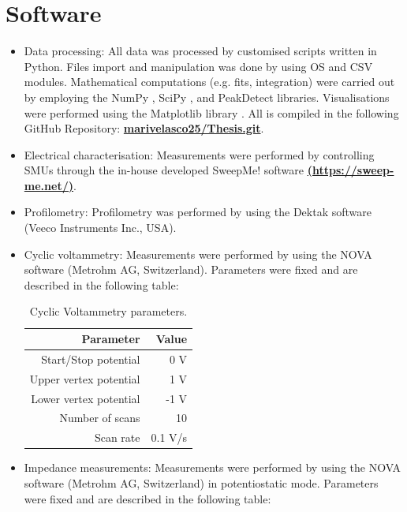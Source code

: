\section{Software} \label{param}
\begin{itemize}
\item Data processing: All data was processed by customised scripts written in Python. Files import and manipulation was done by using OS \cite{os_module} and CSV \cite{csv_module} modules. Mathematical computations (e.g. fits, integration) were carried out by employing the NumPy \cite{numpy_2012}, SciPy \cite{scipy_linreg}, and PeakDetect \cite{peakdetect} libraries. Visualisations were performed using the Matplotlib library \cite{matplotlib_2012}. All is compiled in the following GitHub Repository: \href{https://github.com/marivelascoe25/Thesis.git}{\textbf{marivelasco25/Thesis.git}}.
\item Electrical characterisation: Measurements were performed by controlling SMUs through the in-house developed SweepMe! software \href{https://sweep-me.net/}{\textbf{(https://sweep-me.net/)}}. 
\item Profilometry: Profilometry was performed by using the Dektak software (Veeco Instruments Inc., USA).
\item Cyclic voltammetry: Measurements were performed by using the NOVA software (Metrohm AG, Switzerland). Parameters were fixed and are described in the following table: 

\begin{table}[h]
	\centering
	\caption{Cyclic Voltammetry parameters.}
	\begin{tabular}{r r} \hline
		Parameter	& Value \\ \hline
		Start/Stop potential	& 0 V \\ 
		Upper vertex potential	& 1 V \\ 
		Lower vertex potential	& -1 V \\ 
		Number of scans	& 10 \\ 
		Scan rate	& 0.1 V/s \\ \hline
	\end{tabular}
	\label{tab:CV}
\end{table}

\item Impedance measurements: Measurements were performed by using the NOVA software (Metrohm AG, Switzerland) in potentiostatic mode. Parameters were fixed and are described in the following table: 


\end{itemize}
